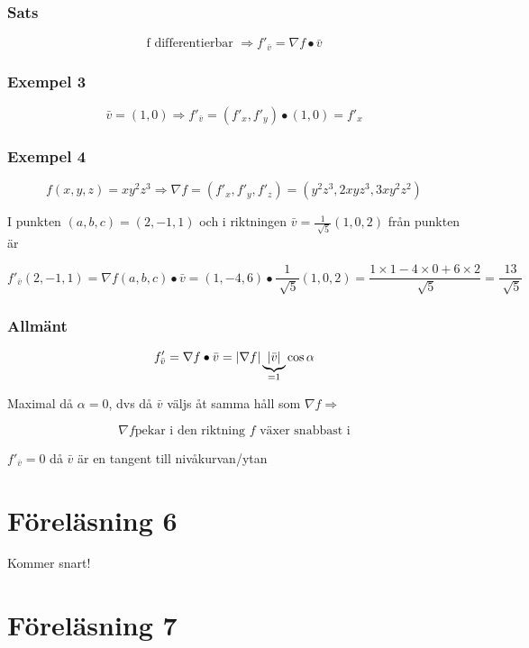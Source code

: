 \documentclass{article}
\DeclarePairedDelimiter \abs{\lvert}{\rvert}
\let\oldsqrt\sqrt
\renewcommand*{\sqrt}[2][\ ]{\oldsqrt[#1]{#2} }
\begin{document}
\newpage
\subsubsection{Sats}
\begin{framed}
\[\text{f differentierbar }\Rightarrow
f'_{\bar{v}} = \nabla f \bullet \bar{v}\]
\end{framed}

\subsubsection{Exempel 3}
\[ \bar{v} = (1,0) \Rightarrow f'_{\bar{v}} = (f'_x,f'_y) \bullet (1,0) = f'_x \]

\subsubsection{Exempel 4}
\[ f(x,y,z) = xy^2z^3 \Rightarrow \nabla f = (f'_x,f'_y,f'_z) = (y^2z^3,2xyz^3,3xy^2z^2) \]

I punkten \((a,b,c) = (2,-1,1)\) och i riktningen \(\bar{v} = \frac{1}{\sqrt{5}}(1,0,2)\) från punkten är 

\[f'_{\bar{v}}(2,-1,1) = \nabla f(a,b,c) \bullet \bar{v} = (1,-4,6) \bullet \frac{1}{\sqrt{5}}(1,0,2) 
= \frac{1 \times 1 - 4 \times 0 + 6 \times 2}{\sqrt{5}} = \frac{13}{\sqrt{5}}\]

\subsubsection{Allmänt}

\[
	f'_{\bar{v}} = \nabla f \bullet \bar{v} = \abs{\nabla f} \underbrace{\abs{\bar{v}}}_{=1} \cos{\alpha}
\]

Maximal då \(\alpha =0\), dvs då \(\bar{v}\) väljs åt samma håll som \(\nabla f \Rightarrow\)

\begin{framed}
\[\nabla f \text{pekar i den riktning } f \text{ växer snabbast i} \]
\end{framed}

\(f'_{\bar{v}} = 0\) då \(\bar{v}\) är en tangent till nivåkurvan/ytan

\newpage
\section{Föreläsning 6}

Kommer snart!

\newpage
\section{Föreläsning 7}
\end{document}
